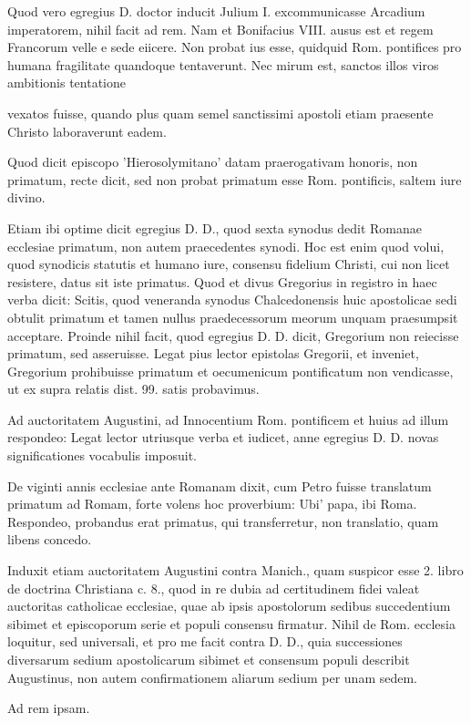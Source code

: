 Quod vero egregius D. doctor inducit Julium I. excommunicasse Arcadium imperatorem, nihil facit ad rem. Nam et Bonifacius VIII. ausus est et regem Francorum velle e sede eiicere. Non probat ius esse, quidquid Rom. pontifices pro humana fragilitate quandoque tentaverunt. Nec mirum est, sanctos illos viros ambitionis tentatione

vexatos fuisse, quando plus quam semel sanctissimi apostoli etiam praesente Christo laboraverunt eadem.

Quod dicit episcopo 'Hierosolymitano' datam praerogativam honoris, non primatum, recte dicit, sed non probat primatum esse Rom. pontificis, saltem iure divino.

Etiam ibi optime dicit egregius D. D., quod sexta synodus dedit Romanae ecclesiae primatum, non autem praecedentes synodi. Hoc est enim quod volui, quod synodicis statutis et humano iure, consensu fidelium Christi, cui non licet resistere, datus sit iste primatus. Quod et divus Gregorius in registro in haec verba dicit: Scitis, quod veneranda synodus Chalcedonensis huic apostolicae sedi obtulit primatum et tamen nullus praedecessorum meorum unquam praesumpsit acceptare. Proinde nihil facit, quod egregius D. D. dicit, Gregorium non reiecisse primatum, sed asseruisse. Legat pius lector epistolas Gregorii, et inveniet, Gregorium prohibuisse primatum et oecumenicum pontificatum non vendicasse, ut ex supra relatis dist. 99. satis probavimus.

Ad auctoritatem Augustini, ad Innocentium Rom. pontificem et huius ad illum respondeo: Legat lector utriusque verba et iudicet, anne egregius D. D. novas significationes vocabulis imposuit.

De viginti annis ecclesiae ante Romanam dixit, cum Petro fuisse translatum primatum ad Romam, forte volens hoc proverbium: Ubi' papa, ibi Roma. Respondeo, probandus erat primatus, qui transferretur, non translatio, quam libens concedo.

Induxit etiam auctoritatem Augustini contra Manich., quam suspicor esse 2. libro de doctrina Christiana c. 8., quod in re dubia ad certitudinem fidei valeat auctoritas catholicae ecclesiae, quae ab ipsis apostolorum sedibus succedentium sibimet et episcoporum serie et populi consensu firmatur. Nihil de Rom. ecclesia loquitur, sed universali, et pro me facit contra D. D., quia successiones diversarum sedium apostolicarum sibimet et consensum populi describit Augustinus, non autem confirmationem aliarum sedium per unam sedem.

Ad rem ipsam.

